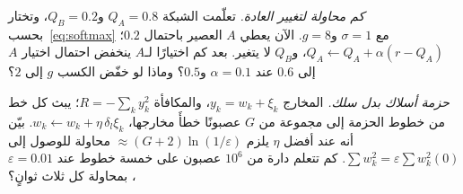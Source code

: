 \begin{exercise}[\lvlA]
\label{ex:10:6}
\emph{كم محاولة لتغيير العادة.} تعلّمت الشبكة $Q_A=0.8$ و$Q_B=0.2$، وتختار بحسب~\eqref{eq:softmax} مع $\sigma=1$ و$g=8$. الآن يعطي $A$ العصير باحتمال $0.2$؛ $Q_A\leftarrow Q_A+\alpha(r-Q_A)$، و$Q_B$ لا يتغير. بعد كم اختيارًا لـ$A$ ينخفض احتمال اختيار $A$ إلى $0.6$ عند $\alpha=0.1$ و$0.5$؟ وماذا لو خفّض  الكسب $g$ إلى $2$؟
\end{exercise}

\begin{exercise}[\lvlC]
\label{ex:10:7}
\emph{حزمة أسلاك بدل سلك.} المخارج $y_k=w_k+\xi_k$، والمكافأة $R=-\sum_ky_k^2$؛ يبث كل خط من خطوط الحزمة إلى مجموعة من $G$ عصبونًا خطأَ مخارجها، $w_k\leftarrow w_k+\eta\,\delta_l\xi_k$. بيّن أنه عند أفضل $\eta$ يلزم $\approx(G+2)\ln(1/\varepsilon)$ محاولة للوصول إلى $\sum w_k^2=\varepsilon\sum w_k^2(0)$. كم تتعلم دارة من $10^6$ عصبون على خمسة خطوط عند $\varepsilon=0.01$، بمحاولة كل ثلاث ثوانٍ؟
\end{exercise}
